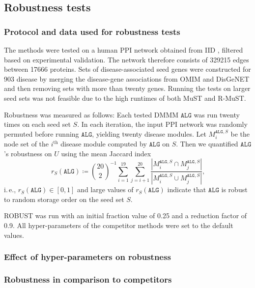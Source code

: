 \documentclass{bioinfo}
\makeatletter
\newcommand{\ie}{i.\,e.\@\xspace}
\newcommand{\ALG}{\ensuremath{\mathtt{ALG}}\xspace}
\makeatother
\begin{document}
\subsection{Robustness tests}

\subsubsection{Protocol and data used for robustness tests}

The methods were tested on a human PPI network obtained from IID \citep{iid_kotlyar2019}, filtered based on experimental validation. The network therefore consists of \num{329215} edges between \num{17666} proteins. Sets of disease-associated seed genes were constructed for \num{903} disease by merging the disease-gene associations from OMIM \citep{Amberger2019-mp} and DisGeNET \citep{disgenet_pinero2020} and then removing sets with more than twenty genes. Running the tests on larger seed sets was not feasible due to the high runtimes of both MuST and R-MuST.

Robustness was measured as follows: Each tested DMMM \ALG was run twenty times on each seed set $S$. In each iteration, the input PPI network was randomly permuted before running \ALG, yielding twenty disease modules. Let $M^{\ALG,S}_i$ be the node set of the $i^\text{th}$ disease module computed by \ALG on $S$. Then we quantified \ALG's robustness on $U$ using the mean Jaccard index
\begin{equation*}
r_S(\ALG) \coloneqq\binom{20}{2}^{-1} \sum_{i=1}^{19} \sum_{j=i+1}^{20} \frac{|M^{\ALG,S}_i \cap M^{\ALG,S}_j|}{|M^{\ALG,S}_i \cup M^{\ALG,S}_j|}\text{,}
\end{equation*}
\ie, $r_S(\ALG)\in[0,1]$ and large values of $r_S(\ALG)$ indicate that \ALG is robust to random storage order on the seed set $S$.

ROBUST was run with an initial fraction value of 0.25 and a reduction factor of 0.9. All hyper-parameters of the competitor methods were set to the default values.

\subsubsection{Effect of hyper-parameters on robustness}

\subsubsection{Robustness in comparison to competitors}
\end{document}
